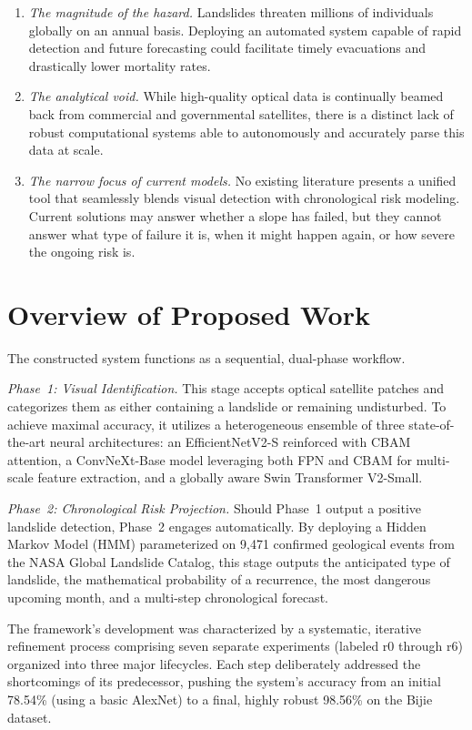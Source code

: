 \documentclass[12pt,a4paper]{report}
\begin{document}
\begin{enumerate}
    \item \textit{The magnitude of the hazard.} Landslides threaten millions of individuals globally on an annual basis. Deploying an automated system capable of rapid detection and future forecasting could facilitate timely evacuations and drastically lower mortality rates.
    \item \textit{The analytical void.} While high-quality optical data is continually beamed back from commercial and governmental satellites, there is a distinct lack of robust computational systems able to autonomously and accurately parse this data at scale.
    \item \textit{The narrow focus of current models.} No existing literature presents a unified tool that seamlessly blends visual detection with chronological risk modeling. Current solutions may answer whether a slope has failed, but they cannot answer what type of failure it is, when it might happen again, or how severe the ongoing risk is.
\end{enumerate}

\section{Overview of Proposed Work}
The constructed system functions as a sequential, dual-phase workflow.

\textit{Phase~1: Visual Identification.} This stage accepts optical satellite patches and categorizes them as either containing a landslide or remaining undisturbed. To achieve maximal accuracy, it utilizes a heterogeneous ensemble of three state-of-the-art neural architectures: an EfficientNetV2-S reinforced with CBAM attention, a ConvNeXt-Base model leveraging both FPN and CBAM for multi-scale feature extraction, and a globally aware Swin Transformer V2-Small.

\textit{Phase~2: Chronological Risk Projection.} Should Phase~1 output a positive landslide detection, Phase~2 engages automatically. By deploying a Hidden Markov Model (HMM) parameterized on 9,471 confirmed geological events from the NASA Global Landslide Catalog, this stage outputs the anticipated type of landslide, the mathematical probability of a recurrence, the most dangerous upcoming month, and a multi-step chronological forecast.

The framework's development was characterized by a systematic, iterative refinement process comprising seven separate experiments (labeled r0 through r6) organized into three major lifecycles. Each step deliberately addressed the shortcomings of its predecessor, pushing the system's accuracy from an initial 78.54\% (using a basic AlexNet) to a final, highly robust 98.56\% on the Bijie dataset.
\end{document}

